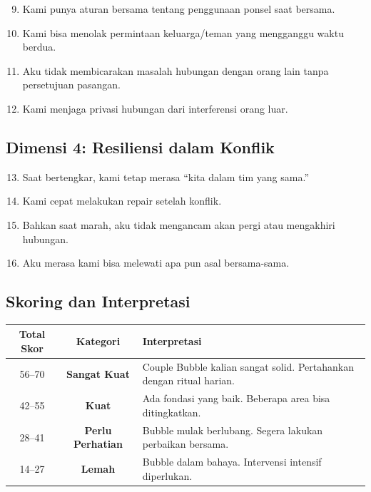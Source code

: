 \begin{exercisebox}
\begin{enumerate}
    \setcounter{enumi}{8}
    \item Kami punya aturan bersama tentang penggunaan ponsel saat bersama.
    \item Kami bisa menolak permintaan keluarga/teman yang mengganggu waktu berdua.
    \item Aku tidak membicarakan masalah hubungan dengan orang lain tanpa persetujuan pasangan.
    \item Kami menjaga privasi hubungan dari interferensi orang luar.
\end{enumerate}

\subsection*{Dimensi 4: Resiliensi dalam Konflik}

\begin{enumerate}
    \setcounter{enumi}{12}
    \item Saat bertengkar, kami tetap merasa ``kita dalam tim yang sama.''
    \item Kami cepat melakukan repair setelah konflik.
    \item Bahkan saat marah, aku tidak mengancam akan pergi atau mengakhiri hubungan.
    \item Aku merasa kami bisa melewati apa pun asal bersama-sama.
\end{enumerate}

\subsection*{Skoring dan Interpretasi}

\begin{center}
\renewcommand{\arraystretch}{1.4}
\begin{tabular}{|c|c|l|}
\hline
\rowcolor{sagegreen!20}
\textbf{Total Skor} & \textbf{Kategori} & \textbf{Interpretasi} \\
\hline
56--70 & \textbf{Sangat Kuat} & Couple Bubble kalian sangat solid. Pertahankan dengan ritual harian. \\
\hline
42--55 & \textbf{Kuat} & Ada fondasi yang baik. Beberapa area bisa ditingkatkan. \\
\hline
28--41 & \textbf{Perlu Perhatian} & Bubble mulak berlubang. Segera lakukan perbaikan bersama. \\
\hline
14--27 & \textbf{Lemah} & Bubble dalam bahaya. Intervensi intensif diperlukan. \\
\hline
\end{tabular}
\end{center}
\end{exercisebox}

